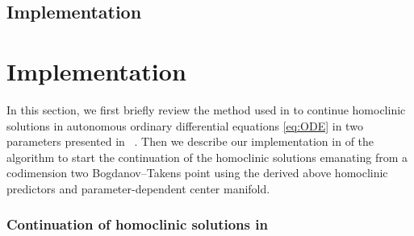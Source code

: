 \ifthesis
\subsection{Implementation}%
\else
\section{Implementation}%
\fi
\label{sec:implementation}
In this section, we first briefly review the method used in \MATCONT to continue
homoclinic solutions in autonomous ordinary differential equations 
\cref{eq:ODE} in two parameters presented in ~\cite{DeWitte2012}. Then we
describe our implementation in \MATCONT of the algorithm to start the continuation of
the homoclinic solutions emanating from a codimension two Bogdanov--Takens point
using the derived above homoclinic predictors and parameter-dependent center manifold.

\ifthesis
\subsubsection{Continuation of homoclinic solutions in \MATCONT}
\else
